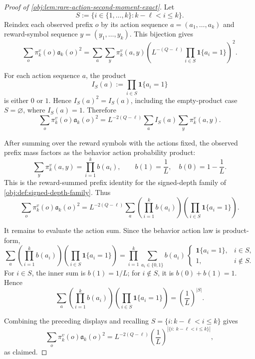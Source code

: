 \documentclass[11pt]{article}
\begin{document}
\begin{proof}[Proof of \cref{obj:lem:rare-action-second-moment-exact}]
Let
\[
S:=\{i\in\{1,\ldots,k\}: k-\ell<i\le k\}.
\]
Reindex each observed prefix \(o\) by its action sequence \(a=(a_1,\ldots,a_k)\) and reward-symbol sequence \(y=(y_1,\ldots,y_k)\). This bijection gives
\[
\sum_o \pi_k^v(o)\mathfrak a_k(o)^2
=
\sum_a\sum_y
\pi_k^v(a,y)
\left(
L^{-(Q-\ell)}
\prod_{i\in S}\mathbf 1\{a_i=1\}
\right)^2 .
\]

For each action sequence \(a\), the product
\[
I_S(a):=\prod_{i\in S}\mathbf 1\{a_i=1\}
\]
is either \(0\) or \(1\). Hence \(I_S(a)^2=I_S(a)\), including the empty-product case \(S=\varnothing\), where \(I_S(a)=1\). Therefore
\[
\sum_o \pi_k^v(o)\mathfrak a_k(o)^2
=
L^{-2(Q-\ell)}
\sum_a I_S(a)\sum_y \pi_k^v(a,y).
\]

After summing over the reward symbols with the actions fixed, the observed prefix mass factors as the behavior action probability product:
\[
\sum_y \pi_k^v(a,y)
=
\prod_{i=1}^k b(a_i),
\qquad
b(1)=\frac1L,\quad b(0)=1-\frac1L .
\]
This is the reward-summed prefix identity for the signed-depth family of \cref{obj:def:signed-depth-family}. Thus
\[
\sum_o \pi_k^v(o)\mathfrak a_k(o)^2
=
L^{-2(Q-\ell)}
\sum_a
\left(\prod_{i=1}^k b(a_i)\right)
\left(\prod_{i\in S}\mathbf 1\{a_i=1\}\right).
\]

It remains to evaluate the action sum. Since the behavior action law is product-form,
\[
\sum_a
\left(\prod_{i=1}^k b(a_i)\right)
\left(\prod_{i\in S}\mathbf 1\{a_i=1\}\right)
=
\prod_{i=1}^k
\sum_{a_i\in\{0,1\}}
b(a_i)\,
\begin{cases}
\mathbf 1\{a_i=1\},& i\in S,\\
1,& i\notin S.
\end{cases}
\]
For \(i\in S\), the inner sum is \(b(1)=1/L\); for \(i\notin S\), it is \(b(0)+b(1)=1\). Hence
\[
\sum_a
\left(\prod_{i=1}^k b(a_i)\right)
\left(\prod_{i\in S}\mathbf 1\{a_i=1\}\right)
=
\left(\frac1L\right)^{|S|}.
\]

Combining the preceding displays and recalling
\(S=\{i:k-\ell<i\le k\}\) gives
\[
\sum_o \pi_k^v(o)\mathfrak a_k(o)^2
=
L^{-2(Q-\ell)}
\left(\frac1L\right)^{|\{i:\ k-\ell<i\le k\}|},
\]
as claimed.
\end{proof}
\end{document}
